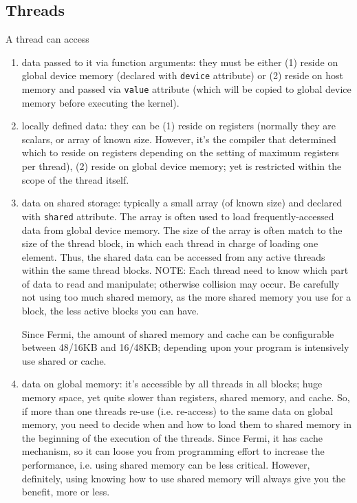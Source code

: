\subsection{Threads}
\label{sec:threads}

A thread can access 
\begin{enumerate}
\item data passed to it via function arguments: they must be either
  (1) reside on global device memory (declared with \verb!device!
  attribute) or (2) reside on host memory and passed via \verb!value!
  attribute (which will be copied to global device memory before
  executing the kernel).

\item locally defined data: they can be (1) reside on registers
  (normally they are scalars, or array of known size. However, it's
  the compiler that determined which to reside on registers depending
  on the setting of maximum registers per thread), (2) reside on
  global device memory; yet is restricted within the scope of the
  thread itself.

\item data on shared storage: typically a small array (of known size)
  and declared with \verb!shared! attribute. The array is often used
  to load frequently-accessed data from global device memory. The size
  of the array is often match to the size of the thread block, in
  which each thread in charge of loading one element. Thus, the shared
  data can be accessed from any active threads within the same thread
  blocks. NOTE: Each thread need to know which part of data to read
  and manipulate; otherwise collision may occur. Be carefully not
  using too much shared memory, as the more shared memory you use for
  a block, the less active blocks you can have.

  Since Fermi, the amount of shared memory and cache can be
  configurable between 48/16KB and 16/48KB; depending upon your
  program is intensively use shared or cache.  

\item data on global memory: it's accessible by all threads in all
  blocks; huge memory space, yet quite slower than registers, shared
  memory, and cache. So, if more than one threads re-use
  (i.e. re-access) to the same data on global memory, you need to
  decide when and how to load them to shared memory in the beginning
  of the execution of the threads. Since Fermi, it has cache
  mechanism, so it can loose you from programming effort to increase
  the performance, i.e. using shared memory can be less
  critical. However, definitely, using knowing how to use shared
  memory will always give you the benefit, more or less.
\end{enumerate}

